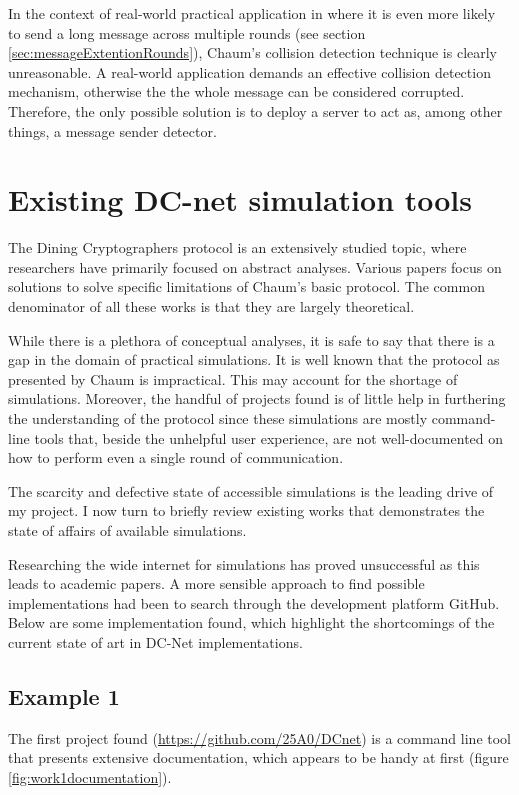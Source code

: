 In the context of real-world practical application in where it is even more likely to send a long message across multiple rounds (see section \ref{sec:messageExtentionRounds}), Chaum's collision detection technique is clearly unreasonable. 
A real-world application demands an effective collision detection mechanism, otherwise the the whole message can be considered corrupted. Therefore, the only possible solution is to deploy a server to act as, among other things, a message sender detector.


\section{Existing DC-net simulation tools} \label{sec:similarWorks}

The Dining Cryptographers protocol is an extensively studied topic, where researchers have primarily focused on abstract analyses. Various papers focus on solutions to solve specific limitations of Chaum's basic protocol. The common denominator of all these works is that they are largely theoretical. 

While there is a plethora of conceptual analyses, it is safe to say that there is a gap in the domain of practical simulations. It is well known that the protocol as presented by Chaum is impractical. This may account for the shortage of simulations. Moreover, the handful of projects found is of little help in furthering the understanding of the protocol since these simulations are mostly command-line tools that, beside the unhelpful user experience, are not well-documented on how to perform even a single round of communication.

The scarcity and defective state of accessible simulations is the leading drive of my project. I now turn to briefly review existing works that demonstrates the state of affairs of available simulations. \newline

Researching the wide internet for simulations has proved unsuccessful as this leads to academic papers. A more sensible approach to find possible implementations had been to search through the development platform GitHub. Below are some implementation found, which highlight the shortcomings of the current state of art in DC-Net implementations.

\subsection{Example 1}
The first project found (\url{https://github.com/25A0/DCnet}) is a command line tool that presents extensive documentation, which appears to be handy at first (figure \ref{fig:work1documentation}).

